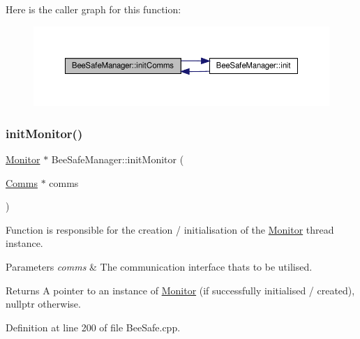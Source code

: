 Here is the caller graph for this function\+:
\nopagebreak
\begin{figure}[H]
\begin{center}
\leavevmode
\includegraphics[width=350pt]{d5/d75/class_bee_safe_manager_a28306d7ccf7136a6086d666f4ebb6566_icgraph}
\end{center}
\end{figure}
\mbox{\label{class_bee_safe_manager_ad30babe45ead2cb6a5b0559afa5bc5ff}} 
\subsubsection{\texorpdfstring{init\+Monitor()}{initMonitor()}}
{\footnotesize\ttfamily \hyperlink{class_monitor}{Monitor} $\ast$ Bee\+Safe\+Manager\+::init\+Monitor (\begin{DoxyParamCaption}\item[{\hyperlink{class_comms}{Comms} $\ast$}]{comms }\end{DoxyParamCaption})\hspace{0.3cm}{\ttfamily [private]}}

Function is responsible for the creation / initialisation of the \hyperlink{class_monitor}{Monitor} thread instance.


\begin{DoxyParams}{Parameters}
{\em comms} & The communication interface that\textquotesingle{}s to be utilised. \\
\hline
\end{DoxyParams}
\begin{DoxyReturn}{Returns}
A pointer to an instance of \hyperlink{class_monitor}{Monitor} (if successfully initialised / created), nullptr otherwise. 
\end{DoxyReturn}


Definition at line 200 of file Bee\+Safe.\+cpp.


